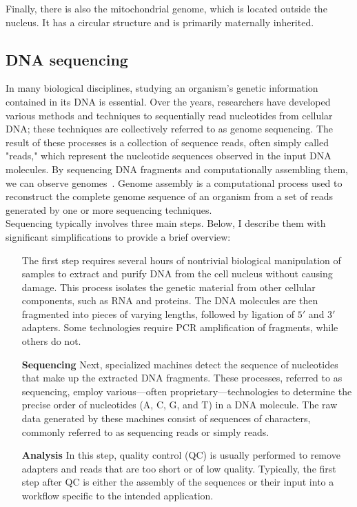Finally, there is also the mitochondrial genome, which is located outside the nucleus. It has a circular structure and is primarily maternally inherited.

\subsection{DNA sequencing}
In many biological disciplines, studying an organism's genetic information contained in its DNA is essential. Over the years, researchers have developed various methods and techniques to sequentially read nucleotides from cellular DNA; these techniques are collectively referred to as genome sequencing. The result of these processes is a collection of sequence reads, often simply called "reads," which represent the nucleotide sequences observed in the input DNA molecules. By sequencing DNA fragments and computationally assembling them, we can observe genomes~\cite{garrison_pangenome}. Genome assembly is a computational process used to reconstruct the complete genome sequence of an organism from a set of reads generated by one or more sequencing techniques.\\
Sequencing typically involves three main steps. Below, I describe them with significant simplifications to provide a brief overview:
\begin{itemize}[leftmargin=1.8cm]
	 \item[\smash{\stackunder{\textbf{Library}}{\textbf{preparation}}}] The first step requires several hours of nontrivial biological manipulation of samples to extract and purify DNA from the cell nucleus without causing damage. This process isolates the genetic material from other cellular components, such as RNA and proteins. The DNA molecules are then fragmented into pieces of varying lengths, followed by ligation of $5\prime$ and $3\prime$ adapters. Some technologies require \gls{PCR} amplification of fragments, while others do not.
	\item[\textbf{Sequencing}]Next, specialized machines detect the sequence of nucleotides that make up the extracted DNA fragments. These processes, referred to as sequencing, employ various—often proprietary—technologies to determine the precise order of nucleotides (A, C, G, and T) in a DNA molecule. The raw data generated by these machines consist of sequences of characters, commonly referred to as sequencing reads or simply reads.
	\item[\textbf{Analysis}] In this step, quality control (\gls{QC}) is usually performed to remove adapters and reads that are too short or of low quality. Typically, the first step after QC is either the assembly of the sequences or their input into a workflow specific to the intended application.
\end{itemize}
